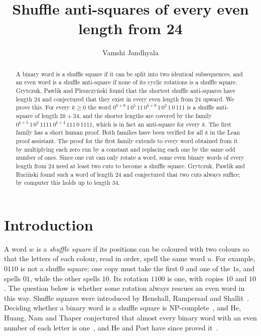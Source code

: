 \documentclass[12pt]{article}
\title{Shuffle anti-squares of every even length from 24}
\author{Vamshi Jandhyala}
\newcommand{\zz}[1]{0^{#1}}
\begin{document}
\maketitle

\begin{abstract}
A binary word is a shuffle square if it can be split into two identical subsequences, and an even word is
a shuffle anti-square if none of its cyclic rotations is a shuffle square. Grytczuk, Pawlik and
Pleszczy\'nski found that the shortest shuffle anti-squares have length 24 and conjectured that they exist in
every even length from 24 upward. We prove this. For every $k \ge 0$ the word
$\zz{k+9}\,1\,\zz{5}\,11\,\zz{k+9}\,1\,\zz{2}\,1\,0\,111$ is a shuffle anti-square of length $2k+34$, and
the shorter lengths are covered by the family $\zz{k+5}\,1\,\zz{2}\,1111\,\zz{k+4}\,111\,0\,1111$, which is in
fact an anti-square for every $k$. The first family has a short human proof. Both families have been verified
for all $k$ in the Lean proof assistant. The proof for the first family extends to every word obtained from it
by multiplying each zero run by a constant and replacing each one by the same odd number of ones. Since one
cut can only rotate a word, some even binary words of every length from 24 need at least two cuts to become a
shuffle square. Grytczuk, Pawlik and Ruci\'nski found such a word of length 24 and conjectured that two cuts always
suffice; by computer this holds up to length 34.
\end{abstract}

\section{Introduction}

A word $w$ is a \emph{shuffle square} if its positions can be coloured with two colours so that the letters of
each colour, read in order, spell the same word $u$. For example, $0110$ is not a shuffle square: one copy must take the first $0$ and one of the $1$s, and spells $01$, while the other spells $10$. Its rotation $1100$ is one, with copies $10$ and $10$. The question below is whether some rotation always rescues an even word in this way. Shuffle squares were introduced by Henshall, Rampersad and
Shallit~\cite{HRS}. Deciding whether a binary word is a shuffle square is NP-complete~\cite{BV}, and He, Huang,
Nam and Thaper conjectured that almost every binary word with an even number of each letter is
one~\cite{HHNT}, and He and Post have since proved it~\cite{HP}.
\end{document}
